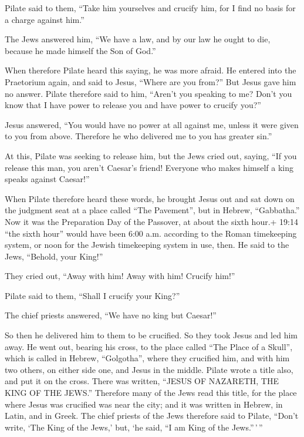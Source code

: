 Pilate said to them, ``Take him yourselves and crucify him, for I find
no basis for a charge against him.''

 The Jews answered him, ``We have a law, and by our law he
ought to die, because he made himself the Son of God.''

 When therefore Pilate heard this saying, he was more
afraid.  He entered into the Praetorium again, and said to
Jesus, ``Where are you from?'' But Jesus gave him no answer.
 Pilate therefore said to him, ``Aren't you speaking to me?
Don't you know that I have power to release you and have power to
crucify you?''

 Jesus answered, ``You would have no power at all against
me, unless it were given to you from above. Therefore he who delivered
me to you has greater sin.''

 At this, Pilate was seeking to release him, but the Jews
cried out, saying, ``If you release this man, you aren't Caesar's
friend! Everyone who makes himself a king speaks against Caesar!''

 When Pilate therefore heard these words, he brought Jesus
out and sat down on the judgment seat at a place called ``The
Pavement'', but in Hebrew, ``Gabbatha.''  Now it was the
Preparation Day of the Passover, at about the sixth hour.+ 19:14 ``the
sixth hour'' would have been 6:00 a.m. according to the Roman
timekeeping system, or noon for the Jewish timekeeping system in use,
then. He said to the Jews, ``Behold, your King!''

 They cried out, ``Away with him! Away with him! Crucify
him!''

Pilate said to them, ``Shall I crucify your King?''

The chief priests answered, ``We have no king but Caesar!''

 So then he delivered him to them to be crucified. So they
took Jesus and led him away.  He went out, bearing his
cross, to the place called ``The Place of a Skull'', which is called in
Hebrew, ``Golgotha'',  where they crucified him, and with
him two others, on either side one, and Jesus in the middle.
 Pilate wrote a title also, and put it on the cross. There
was written, ``JESUS OF NAZARETH, THE KING OF THE JEWS.'' 
Therefore many of the Jews read this title, for the place where Jesus
was crucified was near the city; and it was written in Hebrew, in Latin,
and in Greek.  The chief priests of the Jews therefore said
to Pilate, ``Don't write, `The King of the Jews,' but, `he said, ``I am
King of the Jews.''\,'\,''

